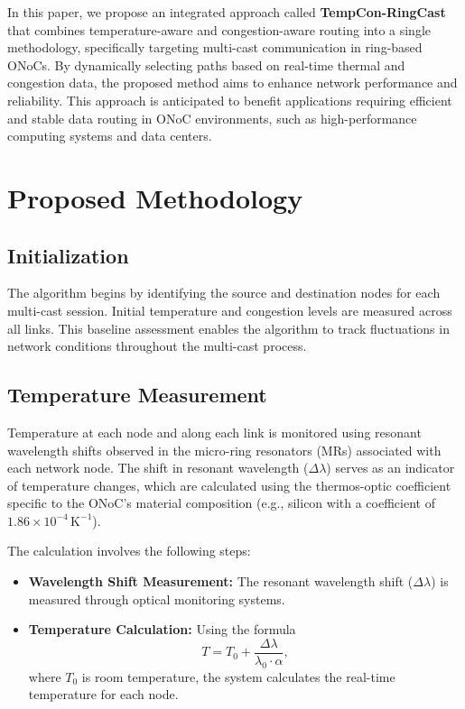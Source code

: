 \documentclass[conference]{IEEEtran}
\begin{document}
In this paper, we propose an integrated approach called \textbf{TempCon-RingCast} that combines temperature-aware and congestion-aware routing into a single methodology, specifically targeting multi-cast communication in ring-based ONoCs. By dynamically selecting paths based on real-time thermal and congestion data, the proposed method aims to enhance network performance and reliability. This approach is anticipated to benefit applications requiring efficient and stable data routing in ONoC environments, such as high-performance computing systems and data centers.

\section{Proposed Methodology}

\subsection{Initialization}
The algorithm begins by identifying the source and destination nodes for each multi-cast session. Initial temperature and congestion levels are measured across all links. This baseline assessment enables the algorithm to track fluctuations in network conditions throughout the multi-cast process.

\subsection{Temperature Measurement}
Temperature at each node and along each link is monitored using resonant wavelength shifts observed in the micro-ring resonators (MRs) associated with each network node. The shift in resonant wavelength (\(\Delta \lambda\)) serves as an indicator of temperature changes, which are calculated using the thermos-optic coefficient specific to the ONoC’s material composition (e.g., silicon with a coefficient of \(1.86 \times 10^{-4} \, \mathrm{K}^{-1}\)).

The calculation involves the following steps:
\begin{itemize}
    \item \textbf{Wavelength Shift Measurement:} The resonant wavelength shift (\(\Delta \lambda\)) is measured through optical monitoring systems.
    \item \textbf{Temperature Calculation:} Using the formula
    \[
    T = T_0 + \frac{\Delta \lambda}{\lambda_0 \cdot \alpha},
    \]
    where \(T_0\) is room temperature, the system calculates the real-time temperature for each node.
\end{itemize}
\end{document}
